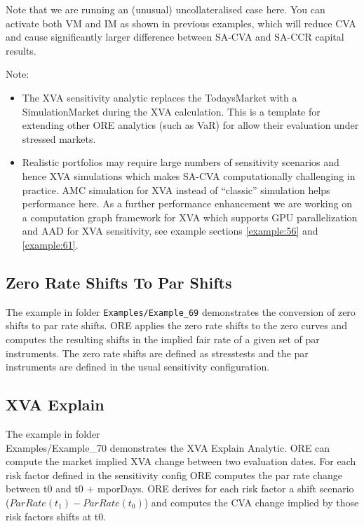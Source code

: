 Note that we are running an (unusual) uncollateralised case here. You can activate both VM and IM as shown in previous examples,
which will reduce CVA and cause significantly larger difference between SA-CVA and SA-CCR capital results.

Note:
\begin{itemize}
\item The XVA sensitivity analytic replaces the TodaysMarket with a SimulationMarket during
  the XVA calculation. This is a template for extending other ORE analytics (such as VaR) for allow their evaluation under
  stressed markets.
\item Realistic portfolios may require large numbers of sensitivity scenarios and hence XVA simulations which makes SA-CVA
  computationally challenging in practice. AMC simulation for XVA instead of ``classic'' simulation helps performance here.
  As a further performance enhancement we are working on a computation graph framework for XVA which supports GPU parallelization
  and AAD for XVA sensitivity, see example sections \ref{example:56} and \ref{example:61}.
\end{itemize}

\subsection{Zero Rate Shifts To Par Shifts}%
\label{example:69}

The example in folder {\tt Examples/Example\_69} demonstrates the conversion of zero shifts to par rate shifts.
ORE applies the zero rate shifts to the zero curves and computes the resulting shifts in the implied fair rate of a given set of par instruments.
The zero rate shifts are defined as stresstests and the par instruments are defined in the usual sensitivity configuration.

\subsection{XVA Explain}%
\label{example:70}

The example in folder {\\ Examples/Example\_70} demonstrates the XVA Explain Analytic.
ORE can compute the market implied XVA change between two evaluation dates. For each risk factor defined in the sensitivity
config ORE computes the par rate change between t0 and t0 + mporDays.
ORE derives for each risk factor a shift scenario ($ParRate(t_1) - ParRate(t_0)$) and computes the CVA change implied by those risk factors shifts at t0.

